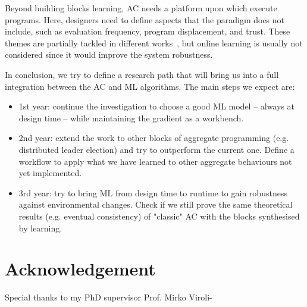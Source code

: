 \documentclass[conference]{IEEEtran}
\begin{document}
Beyond building blocks learning, AC needs a platform upon which execute programs. 
%
Here, designers need to define aspects that the paradigm does not include, such as evaluation frequency, program displacement, and trust.
% 
These themes are partially tackled in different works~\cite{DBLP:journals/scp/CasadeiAV18, DBLP:journals/fi/CasadeiPPVW20, DBLP:journals/corr/abs-2012-13806}, but online learning is usually not considered since it would improve the system robustness.

In conclusion, we try to define a research path that will bring us into a full integration between the AC and ML algorithms.
The main steps we expect are:
\begin{itemize}
    \item 1st year: continue the investigation to choose a good ML model -- always at design time -- while maintaining the gradient as a workbench.
    \item 2nd year: extend the work to other blocks of aggregate programming (e.g. distributed leader election) and try to outperform the current one. Define a workflow to apply what we have learned to other aggregate behaviours not yet implemented.
    \item 3rd year: try to bring ML from design time to runtime to gain robustness against environmental changes. Check if we still prove the same theoretical results (e.g. eventual consistency) of "classic" AC with the blocks synthesised by learning.
\end{itemize}
\section*{Acknowledgement}
Special thanks to my PhD supervisor Prof. Mirko Viroli-


\end{document}
